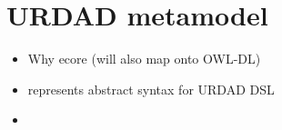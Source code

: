 \section{URDAD metamodel}

\begin{itemize}
  \item Why ecore (will also map onto OWL-DL)
  \item represents abstract syntax for URDAD DSL
  \item 
\end{itemize}